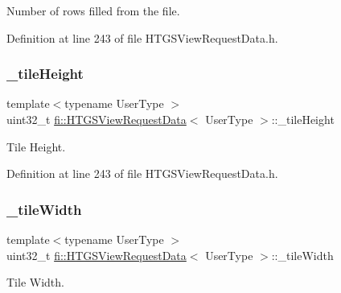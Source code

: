 Number of rows filled from the file. 



Definition at line 243 of file H\+T\+G\+S\+View\+Request\+Data.\+h.

\mbox{\label{classfi_1_1HTGSViewRequestData_a2480147677b6c45055cf82e4650d8ea1}} 
\subsubsection{\texorpdfstring{\+\_\+tile\+Height}{\_tileHeight}}
{\footnotesize\ttfamily template$<$typename User\+Type $>$ \\
uint32\+\_\+t \hyperlink{classfi_1_1HTGSViewRequestData}{fi\+::\+H\+T\+G\+S\+View\+Request\+Data}$<$ User\+Type $>$\+::\+\_\+tile\+Height\hspace{0.3cm}{\ttfamily [private]}}



Tile Height. 



Definition at line 243 of file H\+T\+G\+S\+View\+Request\+Data.\+h.

\mbox{\label{classfi_1_1HTGSViewRequestData_ad17d5ed86e630dd54921c6a2663aceae}} 
\subsubsection{\texorpdfstring{\+\_\+tile\+Width}{\_tileWidth}}
{\footnotesize\ttfamily template$<$typename User\+Type $>$ \\
uint32\+\_\+t \hyperlink{classfi_1_1HTGSViewRequestData}{fi\+::\+H\+T\+G\+S\+View\+Request\+Data}$<$ User\+Type $>$\+::\+\_\+tile\+Width\hspace{0.3cm}{\ttfamily [private]}}



Tile Width. 



